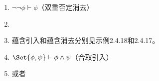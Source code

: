 \documentclass[punct=custom/kaiming,fontset=none]{ctexart}
\makeatletter
\renewenvironment{proof}[1][\proofname]{\par
  \pushQED{\qed}%
  \normalfont \topsep6\p@\@plus6\p@\relax
  \trivlist
  \item[\hskip\labelsep
    \bfseries
    #1%
    ]\ignorespaces
}{%
  \popQED\endtrivlist\@endpefalse
}
\theoremstyle{remark}
\let\proves\vdash
\makeatother
\begin{document}
\begin{description}
\begin{enumerate}
\begin{proof}
    \end{proof}
    \(\neg\neg\phi \proves \phi\)\hfill（\hypertarget{ded:dnElim}{双重否定消去}）
    \begin{proof}
      \leavevmode
      \begin{ND}
        \label{1}
        \label{2}
      \end{ND}
    \end{proof}
  \item 蕴含引入和蕴含消去分别见示例2.4.18和2.4.17。
  \item \(\Set{\phi, \psi} \proves \phi \land \psi\)\hfill（\hypertarget{ded:conjIntro}{合取引入}）
    \begin{proof}
      \leavevmode
      \begin{ND}
        \label{1}
        \label{2}
        \label{3}
        \label{4}
      \end{ND}
      或者
      \begin{ND}
        \label{1}
        \label{2}
        \label{3}

\end{ND}
\end{proof}
\end{enumerate}
\end{description}
\end{document}
